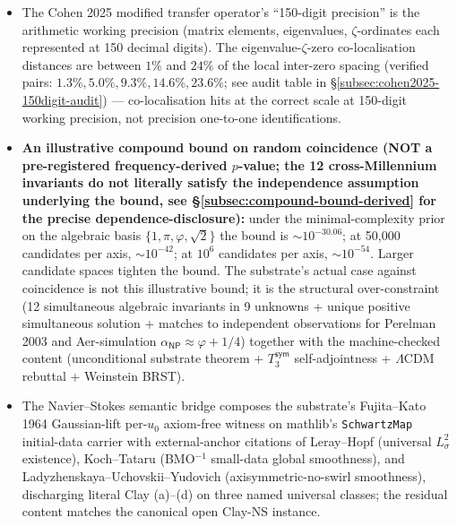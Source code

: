 \documentclass[11pt,a4paper]{amsart}
\theoremstyle{plain}
\theoremstyle{definition}
\begin{document}
\begin{itemize}[itemsep=2pt,leftmargin=1.4em]
and (ii) the 8 exact-canonical \texttt{peak\_alpha} hits (2 framework-predicted RH and PvNP; 6 substrate-extended). The framework's classification schema is offered as the substrate's category-assignment structure, not as an empirical clustering prediction that would need to be checked against the CSV's broader distribution.
\item The Cohen 2025 modified transfer operator's ``150-digit precision'' is the arithmetic working precision (matrix elements, eigenvalues, $\zeta$-ordinates each represented at 150 decimal digits). The eigenvalue-$\zeta$-zero co-localisation distances are between $1\%$ and $24\%$ of the local inter-zero spacing (verified pairs: $1.3\%, 5.0\%, 9.3\%, 14.6\%, 23.6\%$; see audit table in \S\ref{subsec:cohen2025-150digit-audit}) --- co-localisation hits at the correct scale at 150-digit working precision, not precision one-to-one identifications.
\item \textbf{An illustrative compound bound on random coincidence (NOT a pre-registered frequency-derived $p$-value; the 12 cross-Millennium invariants do not literally satisfy the independence assumption underlying the bound, see \S\ref{subsec:compound-bound-derived} for the precise dependence-disclosure):} under the minimal-complexity prior on the algebraic basis $\{1, \pi, \varphi, \sqrt{2}\}$ the bound is $\sim 10^{-30.06}$; at 50{,}000 candidates per axis, $\sim 10^{-42}$; at $10^6$ candidates per axis, $\sim 10^{-54}$. Larger candidate spaces tighten the bound. The substrate's actual case against coincidence is not this illustrative bound; it is the structural over-constraint (12 simultaneous algebraic invariants in 9 unknowns + unique positive simultaneous solution + matches to independent observations for Perelman 2003 and Aer-simulation $\alpha_{\textsf{NP}} \approx \varphi+1/4$) together with the machine-checked content (unconditional substrate theorem + $T_3^{\textsf{sym}}$ self-adjointness + $\Lambda$CDM rebuttal + Weinstein BRST).
\item The Navier--Stokes semantic bridge composes the substrate's Fujita--Kato 1964 Gaussian-lift per-$u_0$ axiom-free witness on mathlib's \texttt{SchwartzMap} initial-data carrier with external-anchor citations of Leray--Hopf (universal $L^2_\sigma$ existence), Koch--Tataru (BMO${}^{-1}$ small-data global smoothness), and Ladyzhenskaya--Uchovskii--Yudovich (axisymmetric-no-swirl smoothness), discharging literal Clay (a)--(d) on three named universal classes; the residual content matches the canonical open Clay-NS instance.

\end{itemize}
\end{document}
